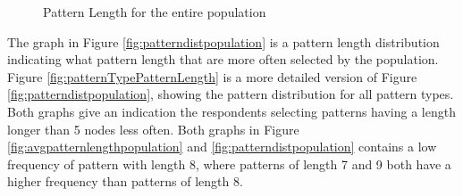     \begin{figure}[H]
      \centering
      \caption{Pattern Length for the entire population}
      \label{fig:patternlengthpopulation}
    \end{figure}

    The graph in Figure \ref{fig:patterndistpopulation} is a pattern length distribution indicating what pattern length that are more often selected by the population. Figure \ref{fig:patternTypePatternLength} is a more detailed version of Figure \ref{fig:patterndistpopulation}, showing the pattern distribution for all pattern types. Both graphs give an indication the respondents selecting patterns having a length longer than 5 nodes less often. Both graphs in Figure \ref{fig:avgpatternlengthpopulation} and \ref{fig:patterndistpopulation} contains a low frequency of pattern with length 8, where patterns of length 7 and 9 both have a higher frequency than patterns of length 8.

